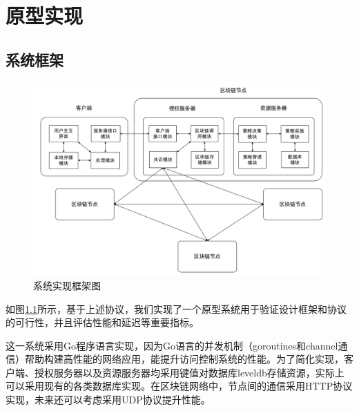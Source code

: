 
\chapter{原型实现}
\label{chap:implementation}

\section{系统框架}

\begin{figure}
\centering
\includegraphics[width=12cm, keepaspectratio]{figures/implementation.png}
\caption{系统实现框架图}
\label{fig:implementation}
\end{figure}

如图\ref{fig:implementation}所示，基于上述协议，我们实现了一个原型系统用于验证设计框架和协议的可行性，并且评估性能和延迟等重要指标。

这一系统采用Go程序语言实现，因为Go语言的并发机制（goroutines和channel通信）帮助构建高性能的网络应用，能提升访问控制系统的性能。为了简化实现，客户端、授权服务器以及资源服务器均采用键值对数据库leveldb存储资源，实际上可以采用现有的各类数据库实现。在区块链网络中，节点间的通信采用HTTP协议实现，未来还可以考虑采用UDP协议提升性能。

